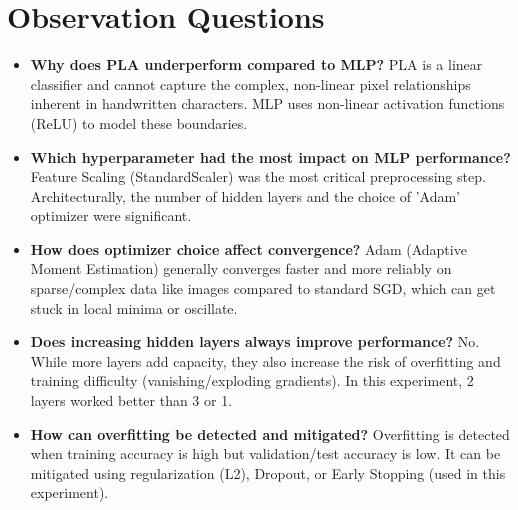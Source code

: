 \documentclass[11pt]{article}
\begin{document}
\section*{Observation Questions}
\begin{itemize}
    \item \textbf{Why does PLA underperform compared to MLP?} PLA is a linear classifier and cannot capture the complex, non-linear pixel relationships inherent in handwritten characters. MLP uses non-linear activation functions (ReLU) to model these boundaries.
    \item \textbf{Which hyperparameter had the most impact on MLP performance?} Feature Scaling (StandardScaler) was the most critical preprocessing step. Architecturally, the number of hidden layers and the choice of 'Adam' optimizer were significant.
    \item \textbf{How does optimizer choice affect convergence?} Adam (Adaptive Moment Estimation) generally converges faster and more reliably on sparse/complex data like images compared to standard SGD, which can get stuck in local minima or oscillate.
    \item \textbf{Does increasing hidden layers always improve performance?} No. While more layers add capacity, they also increase the risk of overfitting and training difficulty (vanishing/exploding gradients). In this experiment, 2 layers worked better than 3 or 1.
    \item \textbf{How can overfitting be detected and mitigated?} Overfitting is detected when training accuracy is high but validation/test accuracy is low. It can be mitigated using regularization (L2), Dropout, or Early Stopping (used in this experiment).
\end{itemize}
\end{document}
